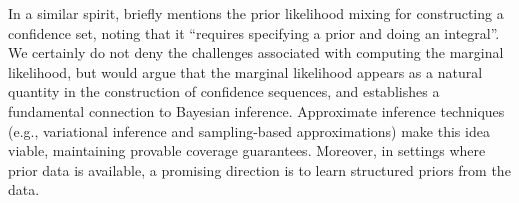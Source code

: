 In a similar spirit, \citet{wasserman2020universal} briefly mentions the prior likelihood mixing for constructing a confidence set, noting that it ``requires specifying a prior and doing an integral''. We certainly do not deny the challenges associated with computing the marginal likelihood, but would argue that the marginal likelihood appears as a natural quantity in the construction of confidence sequences, and establishes a fundamental connection to Bayesian inference. Approximate inference techniques (e.g., variational inference and sampling-based approximations) make this idea viable, maintaining provable coverage guarantees. Moreover, in settings where prior data is available, a promising direction is to learn structured priors from the data. 

